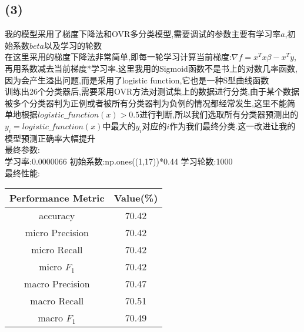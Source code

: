 \documentclass{article}
\begin{document}
\subsection*{(3)}\noindent
我的模型采用了梯度下降法和OVR多分类模型,需要调试的参数主要有学习率$a$,初始系数$beta$以及学习的轮数\\
在这里采用的梯度下降法非常简单,即每一轮学习计算当前梯度:$\nabla f=x^Tx\beta-x^Ty$,再用系数减去当前梯度*学习率.这里我用的Sigmoid函数不是书上的对数几率函数,因为会产生溢出问题,而是采用了logistic function,它也是一种S型曲线函数\\
训练出26个分类器后,需要采用OVR方法对测试集上的数据进行分类,由于某个数据被多个分类器判为正例或者被所有分类器判为负例的情况都经常发生,这里不能简单地根据$logistic\_function(x)>0.5$进行判断,所以我们选取所有分类器预测出的$y_i=logistic\_function(x)$中最大的$y_i$对应的$i$作为我们最终分类.这一改进让我的模型预测正确率大幅提升\\
最终参数:\\
学习率:0.0000066 初始系数:np.ones((1,17))*0.44 学习轮数:1000\\
最终性能:\\
\begin{tabular} {|c|c|}
\hline Performance Metric&Value(\%)\\
\hline accuracy&70.42\\
\hline micro Precision&70.42\\
\hline micro Recall&70.42\\
\hline micro $F_1$&70.42\\
\hline macro Precision&70.47\\
\hline macro Recall&70.51\\
\hline macro $F_1$&70.49\\
\hline
\end{tabular}
\end{document}
